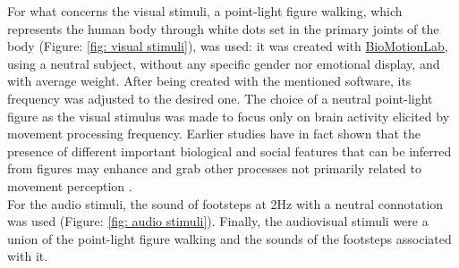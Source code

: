 For what concerns the visual stimuli, a point-light figure walking, which represents the human body through white dots set in the primary joints of the body (Figure: \ref{fig: visual stimuli}), was used: it was created with \href{https://www.biomotionlab.ca/html5-bml-walker/}{BioMotionLab}, using a neutral subject, without any specific gender nor emotional display, and with average weight. After being created with the mentioned software, its frequency was adjusted to the desired one. The choice of a neutral point-light figure as the visual stimulus was made to focus only on brain activity elicited by movement processing frequency. Earlier studies have in fact shown that the presence of different important biological and social features that can be inferred from figures may enhance and grab other processes not primarily related to movement perception \parencite{Cracco_2022}. \\
For the audio stimuli, the sound of footsteps at 2Hz with a neutral connotation was used (Figure: \ref{fig: audio stimuli}). Finally, the audiovisual stimuli were a union of the point-light figure walking and the sounds of the footsteps associated with it. 
